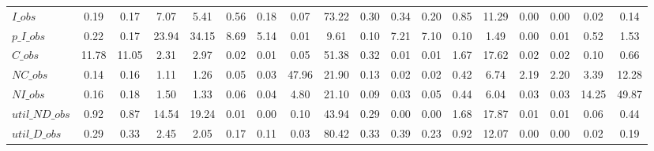 \begin{center}
\begin{longtable}{lccccccccccccccccc}
$I\_obs         $	 & 	            0.19	 & 	            0.17	 & 	            7.07	 & 	            5.41	 & 	            0.56	 & 	            0.18	 & 	            0.07	 & 	           73.22	 & 	            0.30	 & 	            0.34	 & 	            0.20	 & 	            0.85	 & 	           11.29	 & 	            0.00	 & 	            0.00	 & 	            0.02	 & 	            0.14 \\ 
$p\_I\_obs      $	 & 	            0.22	 & 	            0.17	 & 	           23.94	 & 	           34.15	 & 	            8.69	 & 	            5.14	 & 	            0.01	 & 	            9.61	 & 	            0.10	 & 	            7.21	 & 	            7.10	 & 	            0.10	 & 	            1.49	 & 	            0.00	 & 	            0.01	 & 	            0.52	 & 	            1.53 \\ 
$C\_obs         $	 & 	           11.78	 & 	           11.05	 & 	            2.31	 & 	            2.97	 & 	            0.02	 & 	            0.01	 & 	            0.05	 & 	           51.38	 & 	            0.32	 & 	            0.01	 & 	            0.01	 & 	            1.67	 & 	           17.62	 & 	            0.02	 & 	            0.02	 & 	            0.10	 & 	            0.66 \\ 
$NC\_obs        $	 & 	            0.14	 & 	            0.16	 & 	            1.11	 & 	            1.26	 & 	            0.05	 & 	            0.03	 & 	           47.96	 & 	           21.90	 & 	            0.13	 & 	            0.02	 & 	            0.02	 & 	            0.42	 & 	            6.74	 & 	            2.19	 & 	            2.20	 & 	            3.39	 & 	           12.28 \\ 
$NI\_obs        $	 & 	            0.16	 & 	            0.18	 & 	            1.50	 & 	            1.33	 & 	            0.06	 & 	            0.04	 & 	            4.80	 & 	           21.10	 & 	            0.09	 & 	            0.03	 & 	            0.05	 & 	            0.44	 & 	            6.04	 & 	            0.03	 & 	            0.03	 & 	           14.25	 & 	           49.87 \\ 
$util\_ND\_obs  $	 & 	            0.92	 & 	            0.87	 & 	           14.54	 & 	           19.24	 & 	            0.01	 & 	            0.00	 & 	            0.10	 & 	           43.94	 & 	            0.29	 & 	            0.00	 & 	            0.00	 & 	            1.68	 & 	           17.87	 & 	            0.01	 & 	            0.01	 & 	            0.06	 & 	            0.44 \\ 
$util\_D\_obs   $	 & 	            0.29	 & 	            0.33	 & 	            2.45	 & 	            2.05	 & 	            0.17	 & 	            0.11	 & 	            0.03	 & 	           80.42	 & 	            0.33	 & 	            0.39	 & 	            0.23	 & 	            0.92	 & 	           12.07	 & 	            0.00	 & 	            0.00	 & 	            0.02	 & 	            0.19 \\ 

\end{longtable}
\end{center}
